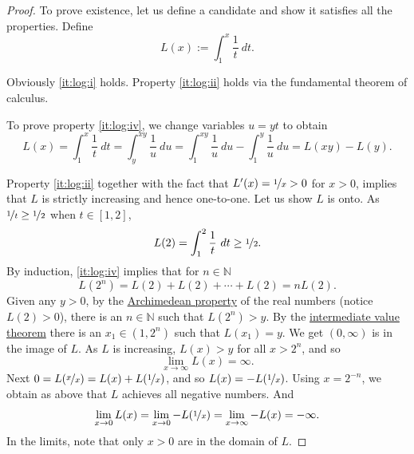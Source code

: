 \documentclass[12pt]{book}
\newcommand{\N}{{\mathbb{N}}}
\theoremstyle{plain}
\theoremstyle{remark}
\theoremstyle{definition}
\theoremstyle{exercise}
\theoremstyle{example}
\begin{document}
\begin{proof}
To prove existence, let us define a candidate and show it satisfies
all the properties.  Define
\begin{equation*}
L(x) := \int_1^x \frac{1}{t}~dt .
\end{equation*}

Obviously \ref{it:log:i} holds.  Property \ref{it:log:ii} holds
via the fundamental theorem of calculus.

To prove property \ref{it:log:iv},
we change variables $u=yt$ to obtain
\begin{equation*}
L(x) =
\int_1^{x} \frac{1}{t}~dt
=
\int_y^{xy} \frac{1}{u}~du
=
\int_1^{xy} \frac{1}{u}~du
-
\int_1^{y} \frac{1}{u}~du
=
L(xy)-L(y) .
\end{equation*}

Property \ref{it:log:ii} together with the fact that $L'(x) = \nicefrac{1}{x} > 0$ 
for $x > 0$, implies that $L$
is strictly increasing and hence one-to-one.
Let us show $L$ is onto.  
As $\nicefrac{1}{t} \geq \nicefrac{1}{2}$ when $t \in [1,2]$,
\begin{equation*}
L(2) = \int_1^2 \frac{1}{t} ~dt \geq \nicefrac{1}{2} .
\end{equation*}
By induction, \ref{it:log:iv} implies that for $n \in \N$
\begin{equation*}
L(2^n) = L(2) + L(2) + \cdots + L(2) = n L(2) .
\end{equation*}
Given any $y > 0$, 
by the \hyperref[thm:arch:i]{Archimedean property} of the real numbers
(notice $L(2) > 0$), there is an $n \in \N$ such that
$L(2^n) > y$.  By the
\hyperref[IVT:thm]{intermediate value theorem}
there is an $x_1 \in (1,2^n)$ such that $L(x_1) = y$.  We get
$(0,\infty)$ is in the image of $L$.
As $L$ is increasing, $L(x) > y$ for all $x > 2^n$, and so
\begin{equation*}
\lim_{x\to\infty} L(x) = \infty .
\end{equation*}
Next
$0 = L(\nicefrac{x}{x}) = L(x) + L(\nicefrac{1}{x})$, and
so $L(x) = - L(\nicefrac{1}{x})$.  Using $x=2^{-n}$, we obtain
as above that $L$ achieves all negative numbers.  And
\begin{equation*}
\lim_{x \to 0} L(x) = 
\lim_{x \to 0} -L(\nicefrac{1}{x})
=
\lim_{x \to \infty} -L(x)
=  - \infty .
\end{equation*}
In the limits, note that only $x > 0$ are in the domain of $L$.


\end{proof}
\end{document}
